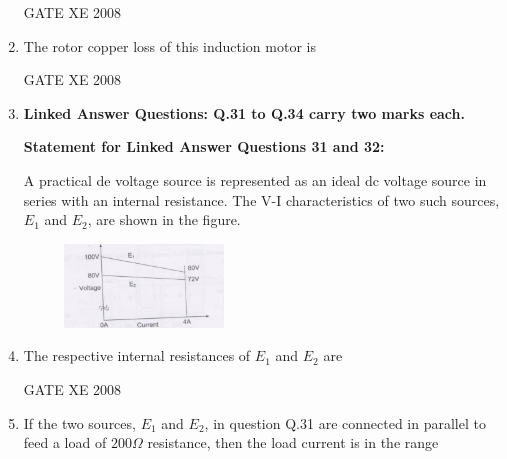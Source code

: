 \documentclass[12pt]{article}
\begin{document}
\begin{enumerate}
GATE XE 2008
\item  The rotor copper loss of this induction motor is

\begin{enumerate}
\end{enumerate}

GATE XE 2008
\item[]\textbf{\Large Linked Answer Questions: Q.31 to Q.34 carry two marks each.}

\textbf{Statement for Linked Answer Questions 31 and 32:}

A practical de voltage source is represented as an ideal dc voltage source in series with an internal
resistance. The V-I characteristics of two such sources, $E_{1}$ and $E_{2}$, are shown in the figure.

\begin{figure}[H]
  \centering
  \includegraphics[width=0.4\textwidth]{figs/q31.png}
  \caption{}
\end{figure}

\item  The respective internal resistances of $E_{1}$ and $E_{2}$ are

\begin{enumerate}
\end{enumerate}

GATE XE 2008
\item  If the two sources, $E_{1}$ and $E_{2}$, in question Q.31 are connected in parallel to feed a load of $200\Omega$ resistance, then the load current is in the range


\end{enumerate}
\end{document}
